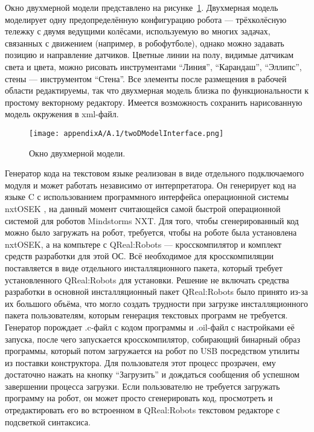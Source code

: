 Окно двухмерной модели представлено на рисунке~\ref{image:twoDModelInterface}. Двухмерная 
модель моделирует одну предопределённую конфигурацию робота --- трёхколёсную тележку 
с двумя ведущими колёсами, используемую во многих задачах, связанных с движением (например, 
в робофутболе), однако можно задавать позицию и направление датчиков. Цветные линии 
на полу, видимые датчикам света и цвета, можно рисовать инструментами "`Линия"', "`Карандаш"', 
"`Эллипс"', стены --- инструментом "`Стена"'. Все элементы после размещения в рабочей 
области редактируемы, так что двухмерная модель близка по функциональности к простому 
векторному редактору. Имеется возможность сохранить нарисованную модель окружения в xml-файл.

\begin{figure} [ht]
	\begin{center}
		\texttt{[image: appendixA/A.1/twoDModelInterface.png]}
		\caption{Окно двухмерной модели.}
		\label{image:twoDModelInterface}
	\end{center}
\end{figure}

Генератор кода на текстовом языке реализован в виде отдельного подключаемого модуля 
и может работать независимо от интерпретатора. Он генерирует код на языке C с использованием 
программного интерфейса операционной системы nxtOSEK%
, на данный момент считающейся самой быстрой операционной системой для роботов Mindstorms NXT. 
Для того, чтобы сгенерированный код можно было загружать на робот, требуется, чтобы 
на роботе была установлена nxtOSEK, а на компьтере с QReal:Robots --- кросскомпилятор 
и комплект средств разработки для этой ОС. Всё необходимое для кросскомпиляции поставляется 
в виде отдельного инсталляционного пакета, который требует установленного QReal:Robots 
для установки. Решение не включать средства разработки в основной инсталляционный 
пакет QReal:Robots было принято из-за их большого объёма, что могло создать трудности 
при загрузке инсталляционного пакета пользователям, которым генерация текстовых программ 
не требуется. Генератор порождает .c-файл с кодом программы и .oil-файл с настройками 
её запуска, после чего запускается кросскомпилятор, собирающий бинарный образ программы, 
который потом загружается на робот по USB посредством утилиты из поставки конструктора. 
Для пользователя этот процесс прозрачен, ему достаточно нажать на кнопку "`Загрузить"' 
и дождаться сообщения об успешном завершении процесса загрузки. Если пользователю 
не требуется загружать программу на робот, он может просто сгенерировать код, просмотреть 
и отредактировать его во встроенном в QReal:Robots текстовом редакторе с подсветкой синтаксиса.

